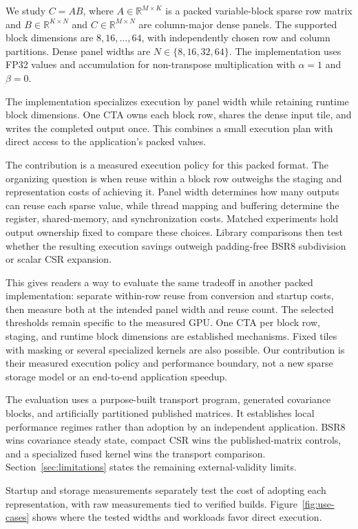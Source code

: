 \documentclass[10pt]{article}
\begin{document}
We study \(C=AB\), where \(A\in\mathbb{R}^{M\times K}\) is a packed
variable-block sparse row matrix and \(B\in\mathbb{R}^{K\times N}\) and
\(C\in\mathbb{R}^{M\times N}\) are column-major dense panels. The supported
block dimensions are \(8,16,\ldots,64\), with independently chosen row and
column partitions. Dense panel widths are \(N\in\{8,16,32,64\}\).
The implementation uses FP32 values and accumulation for non-transpose
multiplication with \(\alpha=1\) and \(\beta=0\).

The implementation specializes execution by panel width while retaining
runtime block dimensions. One CTA owns each block row, shares the dense
input tile, and writes the completed output once. This combines a small
execution plan with direct access to the application's packed values.

The contribution is a measured execution policy for this packed format.
The organizing question is when reuse within a block row outweighs the
staging and representation costs of achieving it. Panel width determines
how many outputs can reuse each sparse value, while thread mapping and
buffering determine the register, shared-memory, and synchronization costs.
Matched experiments hold output ownership fixed to compare these choices.
Library comparisons then test whether the resulting execution savings
outweigh padding-free BSR8 subdivision or scalar CSR expansion.

This gives readers a way to evaluate the same tradeoff in another packed
implementation: separate within-row reuse from conversion and startup
costs, then measure both at the intended panel width and reuse count.
The selected thresholds remain specific to the measured GPU. One CTA per
block row, staging, and runtime block dimensions are established mechanisms.
Fixed tiles with masking or several specialized kernels are also possible.
Our contribution is their measured execution policy and performance boundary,
not a new sparse storage model or an end-to-end application speedup.

The evaluation uses a purpose-built transport program, generated covariance
blocks, and artificially partitioned published matrices. It establishes local
performance regimes rather than adoption by an independent application.
BSR8 wins covariance steady state, compact CSR wins the published-matrix
controls, and a specialized fused kernel wins the transport comparison.
Section~\ref{sec:limitations} states the remaining external-validity limits.

Startup and storage measurements separately test the cost of adopting each
representation, with raw measurements tied to verified builds.
Figure~\ref{fig:use-cases} shows where the tested widths and workloads
favor direct execution.
\end{document}
